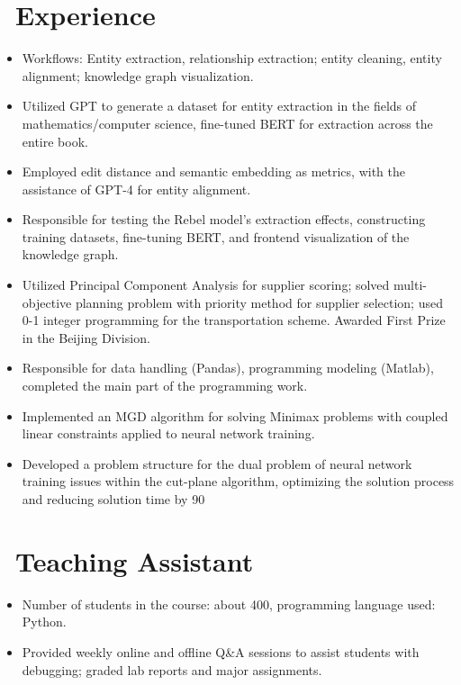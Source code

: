 \documentclass{resume}
\begin{document}
\section{\faUsers\ Experience}
\begin{itemize}
  \item Workflows: Entity extraction, relationship extraction; entity cleaning, entity alignment; knowledge graph visualization.
  \item Utilized GPT to generate a dataset for entity extraction in the fields of mathematics/computer science, fine-tuned BERT for extraction across the entire book.
  \item Employed edit distance and semantic embedding as metrics, with the assistance of GPT-4 for entity alignment.
  \item Responsible for testing the Rebel model's extraction effects, constructing training datasets, fine-tuning BERT, and frontend visualization of the knowledge graph.
\end{itemize}

\begin{itemize}
  \item Utilized Principal Component Analysis for supplier scoring; solved multi-objective planning problem with priority method for supplier selection; used 0-1 integer programming for the transportation scheme. Awarded First Prize in the Beijing Division.
  \item Responsible for data handling (Pandas), programming modeling (Matlab), completed the main part of the programming work.
\end{itemize}

\begin{itemize}
  \item Implemented an MGD algorithm for solving Minimax problems with coupled linear constraints applied to neural network training.
  \item Developed a problem structure for the dual problem of neural network training issues within the cut-plane algorithm, optimizing the solution process and reducing solution time by 90%
\end{itemize}

\section{\faUniversity\ Teaching Assistant}
\begin{itemize}
  \item Number of students in the course: about 400, programming language used: Python.
  \item Provided weekly online and offline Q\&A sessions to assist students with debugging; graded lab reports and major assignments.
\end{itemize}
\end{document}
